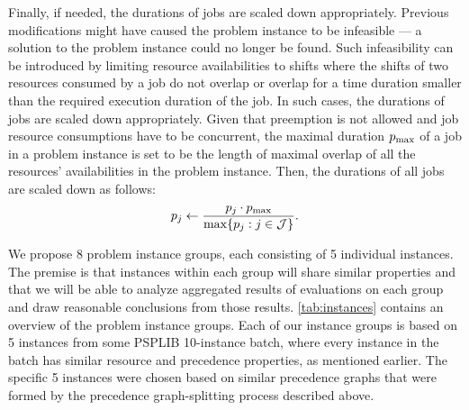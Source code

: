Finally, if needed, the durations of jobs are scaled down appropriately.
Previous modifications might have caused the problem instance to be infeasible
--- a solution to the problem instance could no longer be found.
Such infeasibility can be introduced by limiting resource availabilities to shifts
where the shifts of two resources consumed by a job do not overlap
or overlap for a time duration smaller than the required execution duration of the job.
In such cases, the durations of jobs are scaled down appropriately.
Given that preemption is not allowed and job resource consumptions have to be concurrent,
the maximal duration $p_{\max}$ of a job in a problem instance is set
to be the length of maximal overlap of all the resources' availabilities in the problem instance.
Then, the durations of all jobs are scaled down as follows:
$$
\duration{j} \gets \frac{\duration{j} \cdot \duration{\max}}%
                        {\max\{\duration{j} : j \in \Jobs \}}.
$$

We propose 8 problem instance groups, each consisting of 5 individual instances.
The premise is that instances within each group will share similar properties
and that we will be able to analyze aggregated results of evaluations on each group
and draw reasonable conclusions from those results.
\cref{tab:instances} contains an overview of the problem instance groups.
Each of our instance groups is based on 5 instances from some PSPLIB 10-instance batch,
where every instance in the batch has similar resource and precedence properties,
as mentioned earlier.
The specific 5 instances were chosen based on similar precedence graphs
that were formed by the precedence graph-splitting process described above.

